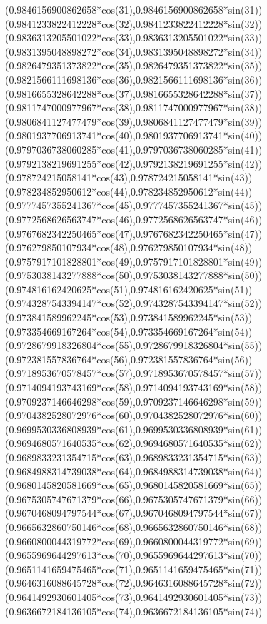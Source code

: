 {({0.9846156900862658*cos(31)},{0.9846156900862658*sin(31)})
({0.9841233822412228*cos(32)},{0.9841233822412228*sin(32)})
({0.9836313205501022*cos(33)},{0.9836313205501022*sin(33)})
({0.9831395048898272*cos(34)},{0.9831395048898272*sin(34)})
({0.9826479351373822*cos(35)},{0.9826479351373822*sin(35)})
({0.9821566111698136*cos(36)},{0.9821566111698136*sin(36)})
({0.9816655328642288*cos(37)},{0.9816655328642288*sin(37)})
({0.9811747000977967*cos(38)},{0.9811747000977967*sin(38)})
({0.9806841127477479*cos(39)},{0.9806841127477479*sin(39)})
({0.9801937706913741*cos(40)},{0.9801937706913741*sin(40)})
({0.9797036738060285*cos(41)},{0.9797036738060285*sin(41)})
({0.9792138219691255*cos(42)},{0.9792138219691255*sin(42)})
({0.978724215058141*cos(43)},{0.978724215058141*sin(43)})
({0.978234852950612*cos(44)},{0.978234852950612*sin(44)})
({0.9777457355241367*cos(45)},{0.9777457355241367*sin(45)})
({0.9772568626563747*cos(46)},{0.9772568626563747*sin(46)})
({0.9767682342250465*cos(47)},{0.9767682342250465*sin(47)})
({0.976279850107934*cos(48)},{0.976279850107934*sin(48)})
({0.9757917101828801*cos(49)},{0.9757917101828801*sin(49)})
({0.9753038143277888*cos(50)},{0.9753038143277888*sin(50)})
({0.974816162420625*cos(51)},{0.974816162420625*sin(51)})
({0.9743287543394147*cos(52)},{0.9743287543394147*sin(52)})
({0.973841589962245*cos(53)},{0.973841589962245*sin(53)})
({0.973354669167264*cos(54)},{0.973354669167264*sin(54)})
({0.9728679918326804*cos(55)},{0.9728679918326804*sin(55)})
({0.972381557836764*cos(56)},{0.972381557836764*sin(56)})
({0.9718953670578457*cos(57)},{0.9718953670578457*sin(57)})
({0.9714094193743169*cos(58)},{0.9714094193743169*sin(58)})
({0.9709237146646298*cos(59)},{0.9709237146646298*sin(59)})
({0.9704382528072976*cos(60)},{0.9704382528072976*sin(60)})
({0.9699530336808939*cos(61)},{0.9699530336808939*sin(61)})
({0.9694680571640535*cos(62)},{0.9694680571640535*sin(62)})
({0.9689833231354715*cos(63)},{0.9689833231354715*sin(63)})
({0.9684988314739038*cos(64)},{0.9684988314739038*sin(64)})
({0.9680145820581669*cos(65)},{0.9680145820581669*sin(65)})
({0.9675305747671379*cos(66)},{0.9675305747671379*sin(66)})
({0.9670468094797544*cos(67)},{0.9670468094797544*sin(67)})
({0.9665632860750146*cos(68)},{0.9665632860750146*sin(68)})
({0.9660800044319772*cos(69)},{0.9660800044319772*sin(69)})
({0.9655969644297613*cos(70)},{0.9655969644297613*sin(70)})
({0.9651141659475465*cos(71)},{0.9651141659475465*sin(71)})
({0.9646316088645728*cos(72)},{0.9646316088645728*sin(72)})
({0.9641492930601405*cos(73)},{0.9641492930601405*sin(73)})
({0.9636672184136105*cos(74)},{0.9636672184136105*sin(74)})
}

